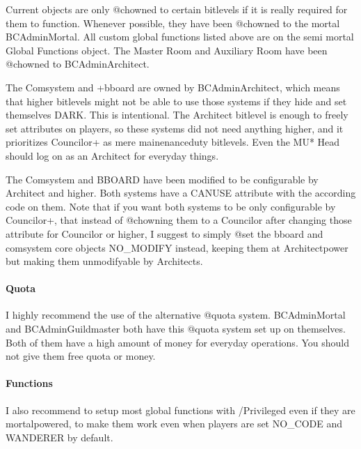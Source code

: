 \documentclass[letterpaper,10pt,english]{sphinxmanual}
\begin{document}
\sphinxAtStartPar
Current objects are only @chowned to certain bitlevels if it is really required
for them to function. Whenever possible, they have been @chowned to the mortal
BC\sphinxhyphen{}Admin\sphinxhyphen{}Mortal. All custom global functions listed above are on the semi\sphinxhyphen{}
\sphinxhyphen{}mortal Global Functions object. The Master Room and Auxiliary Room have been
@chowned to BC\sphinxhyphen{}Admin\sphinxhyphen{}Architect.

\sphinxAtStartPar
The Comsystem and +bboard are owned by BC\sphinxhyphen{}Admin\sphinxhyphen{}Architect, which means that
higher bitlevels might not be able to use those systems if they hide and set
themselves DARK. This is intentional. The Architect bitlevel is enough to freely
set attributes on players, so these systems did not need anything higher, and
it prioritizes Councilor+ as mere mainenance\sphinxhyphen{}duty bitlevels. Even the MU* Head
should log on as an Architect for everyday things.

\sphinxAtStartPar
The Comsystem and BBOARD have been modified to be configurable by Architect and
higher. Both systems have a CANUSE attribute with the according code on them.
Note that if you want both systems to be only configurable by Councilor+, that
instead of @chowning them to a Councilor after changing those attribute for
Councilor or higher, I suggest to simply @set the bboard and comsystem core
objects NO\_MODIFY instead, keeping them at Architect\sphinxhyphen{}power but making them
unmodifyable by Architects.


\paragraph{Quota}
\label{\detokenize{gettingstarted:quota}}
\sphinxAtStartPar
I highly recommend the use of the alternative @quota system. BC\sphinxhyphen{}Admin\sphinxhyphen{}Mortal
and BC\sphinxhyphen{}Admin\sphinxhyphen{}Guildmaster both have this @quota system set up on themselves. Both
of them have a high amount of money for everyday operations. You should not give
them free quota or money.


\paragraph{Functions}
\label{\detokenize{gettingstarted:id15}}
\sphinxAtStartPar
I also recommend to setup most global functions with /Privileged even if they
are mortal\sphinxhyphen{}powered, to make them work even when players are set NO\_CODE and
WANDERER by default.
\end{document}
